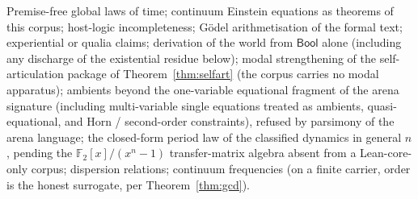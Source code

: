 \documentclass[11pt,a4paper]{article}
\theoremstyle{plain}
\theoremstyle{definition}
\theoremstyle{remark}
\newcommand{\Bool}{\mathsf{Bool}}
\begin{document}
\begin{statusrefused}
Premise-free global laws of time; continuum Einstein equations as
theorems of this corpus; host-logic incompleteness; G\"odel
arithmetisation of the formal text; experiential or qualia claims;
derivation of the world from $\Bool$ alone (including any discharge of
the existential residue below); modal strengthening of the
self-articulation package of Theorem~\ref{thm:selfart} (the corpus
carries no modal apparatus); ambients beyond the one-variable
equational fragment of the arena signature (including multi-variable
single equations treated as ambients, quasi-equational, and Horn /
second-order constraints), refused by parsimony of the arena language;
the closed-form period law of the classified dynamics in general $n$,
pending the $\mathbb{F}_2[x]/(x^n{-}1)$ transfer-matrix algebra absent
from a Lean-core-only corpus; dispersion relations; continuum
frequencies (on a finite carrier, order is the honest surrogate, per
Theorem~\ref{thm:gcd}).
\end{statusrefused}
\end{document}
